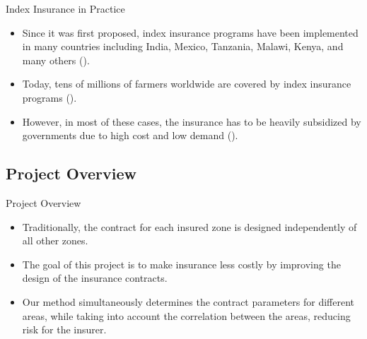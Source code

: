 \documentclass{beamer}
\begin{document}
\begin{frame}{Index Insurance in Practice}
\begin{itemize}
    \setlength\itemsep{1.5em}
    \item Since it was first proposed, index insurance programs have been implemented in many countries including India, Mexico, Tanzania, Malawi, Kenya, and many others (\cite{jensen2017agricultural}). 
    
    \item Today, tens of millions of farmers worldwide are covered by index insurance programs (\cite{greatrex2015scaling}). 
    
    \item However, in most of these cases, the insurance has to be heavily subsidized by governments due to high cost and low demand (\cite{greatrex2015scaling}). 
\end{itemize}
\end{frame}

\subsection{Project Overview}
\begin{frame}{Project Overview}
 \begin{itemize}
    \setlength\itemsep{1em}   
    \item Traditionally, the contract for each insured zone is designed independently of all other zones. %
    \item The goal of this project is to make insurance less costly by improving the design of the insurance contracts.
    \item Our method simultaneously determines the contract parameters for different areas, while taking into account the correlation between the areas, reducing risk for the insurer. 
 \end{itemize}
\end{frame}

\end{document}
